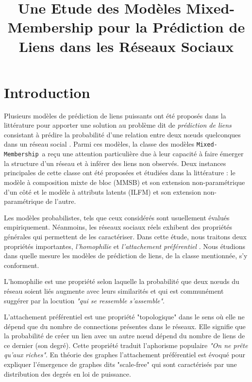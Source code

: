 \documentclass[french]{hermes-journal}
\title[]{Une Etude des Modèles Mixed-Membership pour la Prédiction de Liens dans les Réseaux Sociaux}
\newcommand{\mmm}{\texttt{Mixed-Membership}~}
\begin{document}
\maketitle

\newpage






\section{Introduction}

\label{sec:intro}

Plusieurs modèles de prédiction de liens puissants ont été proposés dans la littérature pour apporter une solution au problème dit de \textit{prédiction de liens} consistant à prédire la probabilité d'une relation entre deux n\oe{}uds quelconques dans un réseau social \cite{LibenNowell07, HassanZaki11}.
Parmi ces modèles, la classe des modèles \mmm a reçu une attention particulière due à leur capacité à faire émerger la structure d'un réseau et à inférer des liens non observés.
Deux instances principales de cette classe ont été proposées et étudiées  dans la littérature : le modèle à composition mixte de bloc (MMSB) \cite{MMSB} et son extension non-paramétrique \cite{iMMSB, fan2015dynamic} d'un côté et le modèle à attributs latents (ILFM) \cite{BMF} et son extension non-paramétrique \cite{ILFRM} de l'autre. 


Les modèles probabilistes, tels que ceux considérés sont usuellement évalués empiriquement. Néanmoins, les réseaux sociaux réels exhibent des propriétés générales qui permettent de les caractériser. Dans cette étude, nous traitons deux propriétés importantes, \textit{l'homophilie} et \textit{l'attachement préférentiel} \cite{ Barabasi2003}. Nous étudions dans quelle mesure les modèles de prédiction de liens, de la classe mentionnée, s'y conforment.

L'homophilie est une propriété selon laquelle la probabilité que deux n\oe{}uds du réseau soient liés augmente avec leurs similarités et qui est communément suggérer par la locution \emph{"qui se ressemble s'assemble"}.

L'attachement préférentiel est une propriété "topologique" dans le sens où elle ne dépend que du nombre de connections présentes dans le réseaux. Elle signifie que la probabilité de créer un lien avec un autre n\oe{}ud dépend du nombre de liens de ce dernier (son degré). Cette propriété traduit l'aphorisme populaire \emph{"On ne prête qu'aux riches"}. En théorie des graphes l'attachement préférentiel est évoqué pour expliquer l'émergence de graphes dits "scale-free" qui sont caractérisés par une distribution des degrés en loi de puissance.
\end{document}
